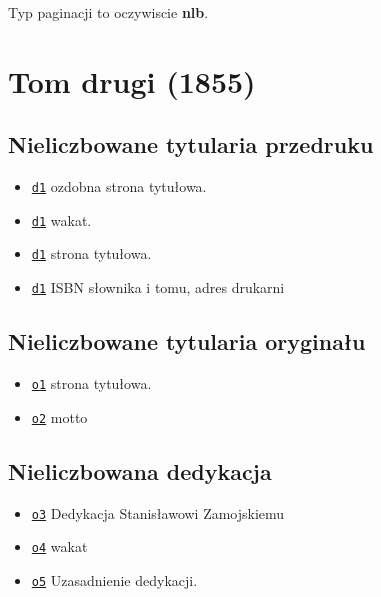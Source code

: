 \documentclass[12]{mwart}
\begin{document}
Typ paginacji to oczywiscie \textbf{nlb}.


\section{Tom drugi (1855)}
\label{sec:tom-drugi}

\newcommand{\paii}[2]{http://teksty.klf.uw.edu.pl/20/6/LindeIIGP#1ocri.djvu?djvuopts=\&page=#2\&zoom=page}

\subsection{Nieliczbowane tytularia przedruku}
\label{sec:niel-tytul-przedr-1}

\begin{itemize}
\item \href{\paii{2}{1}}{\texttt{d1}} ozdobna strona tytułowa.
\item \href{\paii{2}{2}}{\texttt{d1}} wakat.
\item \href{\paii{2}{3}}{\texttt{d1}} strona tytułowa.
\item \href{\paii{1}{4}}{\texttt{d1}} ISBN słownika i tomu, adres drukarni
\end{itemize}

\subsection{Nieliczbowane tytularia oryginału}
\label{sec:niel-tytul-oryg}

\begin{itemize}
\item \href{\paii{2}{5}}{\texttt{o1}}  strona tytułowa.
\item \href{\paii{2}{6}}{\texttt{o2}} motto
\end{itemize}

\subsection{Nieliczbowana dedykacja}
\label{sec:niel-dedyk-1}

\begin{itemize}
\item \href{\paii{2}{7}}{\texttt{o3}}  Dedykacja Stanisławowi Zamojskiemu
\item \href{\paii{2}{8}}{\texttt{o4}}  wakat
\item \href{\paii{2}{9}}{\texttt{o5}}  Uzasadnienie dedykacji.

\end{itemize}
\end{document}

